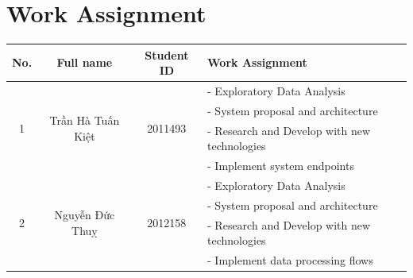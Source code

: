 \documentclass[12pt, a4paper]{report}
\begin{document}
\chapter*{Work Assignment}
\begin{table}[H]
    \centering
    \renewcommand{\arraystretch}{1.5}
    \begin{tabular}{|c|c|c|l|}
        \hline
        \textbf{No.}       & \textbf{Full name}                 & \textbf{Student ID}      & \textbf{Work Assignment}                     \\
        \hline
        \multirow{4}{*}{1} & \multirow{4}{*}{Trần Hà Tuấn Kiệt} & \multirow{4}{*}{2011493} & - Exploratory Data Analysis                  \\
                           &                                    &                          & - System proposal and architecture           \\
                           &                                    &                          & - Research and Develop with new technologies \\
                           &                                    &                          & - Implement system endpoints                 \\
        \hline
        \multirow{4}{*}{2} & \multirow{4}{*}{Nguyễn Đức Thuỵ}   & \multirow{4}{*}{2012158} & - Exploratory Data Analysis                  \\
                           &                                    &                          & - System proposal and architecture           \\
                           &                                    &                          & - Research and Develop with new technologies \\
                           &                                    &                          & - Implement data processing flows            \\
        \hline
    \end{tabular}
\end{table}
\newpage

\renewcommand{\contentsname}{Table of Contents}
\renewcommand{\listfigurename}{List of Figures}
\renewcommand{\listtablename}{List of Tables}
\renewcommand{\bibname}{References}
\renewcommand{\figurename}{Figure}

\tableofcontents
\newpage
\end{document}
